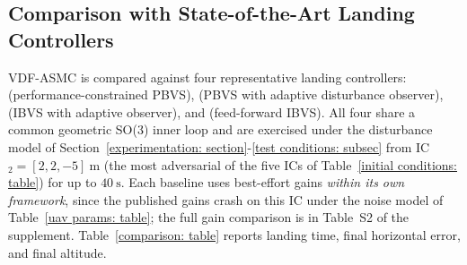 \subsection{Comparison with State-of-the-Art Landing Controllers}
\label{comparison: subsec}
VDF-ASMC is compared against four representative landing controllers: \cite{lin2022} (performance-constrained PBVS), \cite{zhang2026} (PBVS with adaptive disturbance observer), \cite{chen2025} (IBVS with adaptive observer), and \cite{cho2022} (feed-forward IBVS). All four share a common geometric SO(3) inner loop and are exercised under the disturbance model of Section~\ref{experimentation: section}-\ref{test conditions: subsec} from IC$_2=[2,2,-5]~\text{m}$ (the most adversarial of the five ICs of Table~\ref{initial conditions: table}) for up to $40~\text{s}$. Each baseline uses best-effort gains \emph{within its own framework}, since the published gains crash on this IC under the noise model of Table~\ref{uav params: table}; the full gain comparison is in Table~S2 of the supplement. Table~\ref{comparison: table} reports landing time, final horizontal error, and final altitude.

